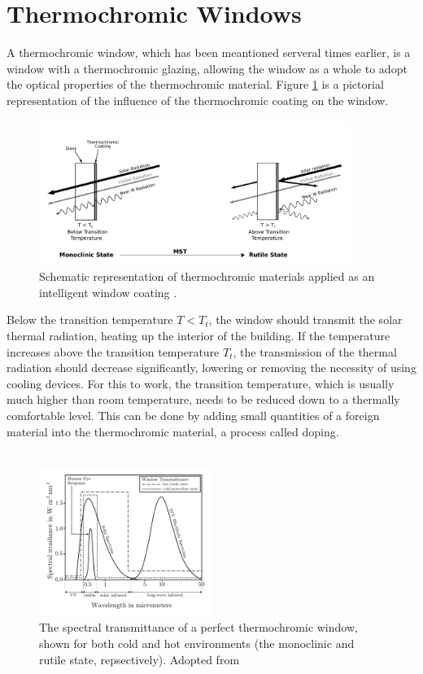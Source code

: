 \section{Thermochromic Windows}
A thermochromic window, which has been meantioned serveral times earlier, is a window
with a thermochromic glazing, allowing the window as a whole to adopt the 
optical properties of the thermochromic material. Figure \ref{fig:TCcoating} is a pictorial representation
of the influence of the thermochromic coating on the window. 
%
\begin{figure}[h!]
  \centering
   \includegraphics[width=0.9\textwidth]{Figures/TCcoating2.pdf}
   \caption{Schematic representation of thermochromic materials applied as an 
   intelligent window coating \cite{Kiria2010}.
   }
   \label{fig:TCcoating}
\end{figure}
%
Below the transition temperature $T<T_t$, the window should transmit the solar thermal radiation, heating 
up the interior of the building. If the temperature increases above the transition temperature $T_t$,
the transmission of the thermal radiation should decrease significantly, lowering or removing
the necessity of using cooling devices. For this to work, the transition temperature, which
is usually much higher than room temperature, needs to be reduced down to a thermally comfortable 
level. This can be done by adding small quantities of a foreign material into the thermochromic 
material, a process called doping.
\\
\\
%
\begin{figure}[h!]
  \centering
   \includegraphics[width=0.5\textwidth]{Figures/TCWtransmittanceMcCluney1996andKamali2013.pdf}
   \caption{The spectral transmittance of a perfect thermochromic window, shown for both 
   cold and hot environments (the monoclinic and rutile state, repsectively). 
   Adopted from \cite[p.~15]{McCluney1996} %
   }
   \label{fig:idealTCW}
\end{figure}
